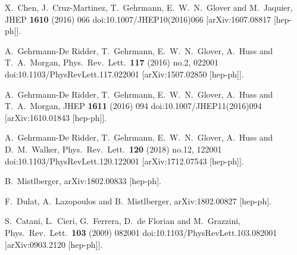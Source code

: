 \documentclass[12pt]{article}
\begin{document}
\begin{thebibliography}{99}
  X.~Chen, J.~Cruz-Martinez, T.~Gehrmann, E.~W.~N.~Glover and M.~Jaquier,
  JHEP {\bf 1610} (2016) 066
  doi:10.1007/JHEP10(2016)066
  [arXiv:1607.08817 [hep-ph]].

  A.~Gehrmann-De Ridder, T.~Gehrmann, E.~W.~N.~Glover, A.~Huss and T.~A.~Morgan,
  Phys.\ Rev.\ Lett.\  {\bf 117} (2016) no.2,  022001
  doi:10.1103/PhysRevLett.117.022001
  [arXiv:1507.02850 [hep-ph]].

  A.~Gehrmann-De Ridder, T.~Gehrmann, E.~W.~N.~Glover, A.~Huss and T.~A.~Morgan,
  JHEP {\bf 1611} (2016) 094
  doi:10.1007/JHEP11(2016)094
  [arXiv:1610.01843 [hep-ph]].
  
  A.~Gehrmann-De Ridder, T.~Gehrmann, E.~W.~N.~Glover, A.~Huss and D.~M.~Walker,
  Phys.\ Rev.\ Lett.\  {\bf 120} (2018) no.12,  122001
  doi:10.1103/PhysRevLett.120.122001
  [arXiv:1712.07543 [hep-ph]].




  B.~Mistlberger,
  arXiv:1802.00833 [hep-ph].

  F.~Dulat, A.~Lazopoulos and B.~Mistlberger,
  arXiv:1802.00827 [hep-ph].
  
  S.~Catani, L.~Cieri, G.~Ferrera, D.~de Florian and M.~Grazzini,
  Phys.\ Rev.\ Lett.\  {\bf 103} (2009) 082001
  doi:10.1103/PhysRevLett.103.082001
  [arXiv:0903.2120 [hep-ph]].


\end{thebibliography}
\end{document}
